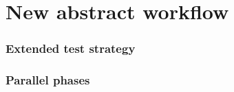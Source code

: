 \section{New abstract workflow}\label{sec:new-abstract-workflow}


\subsubsection{Extended test strategy}

\subsubsection{Parallel phases}
